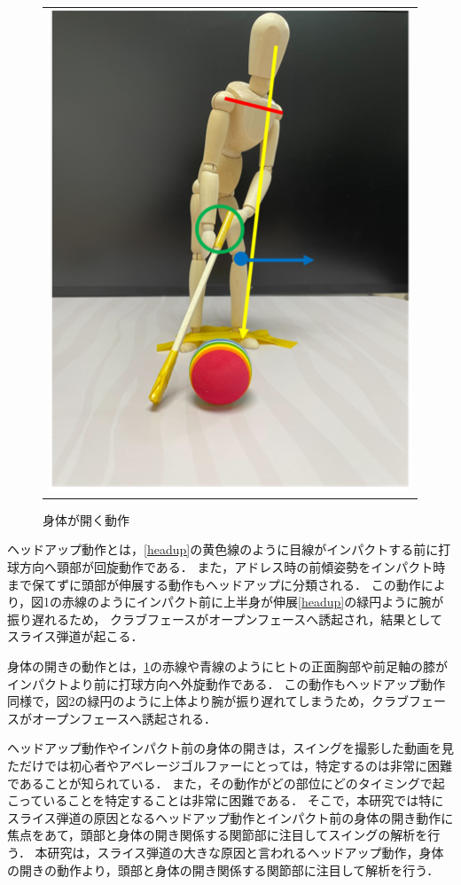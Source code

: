 \begin{figure}
\begin{center}
\begin{tabular}{c}
            \begin{minipage}{0.5\hsize}
                \begin{center}
                    \includegraphics{./images/opening.png}
                    \caption{身体が開く動作}
                    \label{opening}
                \end{center}
            \end{minipage}
        \end{tabular}
    \end{center}
\end{figure}

ヘッドアップ動作とは，\ref{headup}の黄色線のように目線がインパクトする前に打球方向へ頸部が回旋動作である．
また，アドレス時の前傾姿勢をインパクト時まで保てずに頭部が伸展する動作もヘッドアップに分類される．
この動作により，図1の赤線のようにインパクト前に上半身が伸展\ref{headup}の緑円ように腕が振り遅れるため，
クラブフェースがオープンフェースへ誘起され，結果としてスライス弾道が起こる．

身体の開きの動作とは，\ref{opening}の赤線や青線のようにヒトの正面胸部や前足軸の膝がインパクトより前に打球方向へ外旋動作である．
この動作もヘッドアップ動作同様で，図2の緑円のように上体より腕が振り遅れてしまうため，クラブフェースがオープンフェースへ誘起される．

ヘッドアップ動作やインパクト前の身体の開きは，スイングを撮影した動画を見ただけでは初心者やアベレージゴルファーにとっては，特定するのは非常に困難であることが知られている．
また，その動作がどの部位にどのタイミングで起こっていることを特定することは非常に困難である．
そこで，本研究では特にスライス弾道の原因となるヘッドアップ動作とインパクト前の身体の開き動作に焦点をあて，頭部と身体の開き関係する関節部に注目してスイングの解析を行う．
本研究は，スライス弾道の大きな原因と言われるヘッドアップ動作，身体の開きの動作より，頭部と身体の開き関係する関節部に注目して解析を行う．